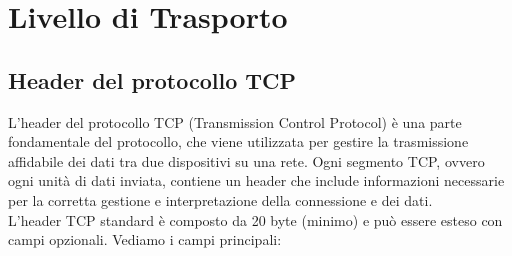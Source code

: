 \documentclass[a4paper]{article}
\begin{document}
\pagebreak

\section{Livello di Trasporto}

\subsection{Header del protocollo TCP}

L'header del protocollo TCP (Transmission Control Protocol) è una parte fondamentale del protocollo, che viene utilizzata per gestire la trasmissione affidabile dei dati tra due dispositivi su una rete. Ogni segmento TCP, ovvero ogni unità di dati inviata, contiene un header che include informazioni necessarie per la corretta gestione e interpretazione della connessione e dei dati.
\\
L'header TCP standard è composto da 20 byte (minimo) e può essere esteso con campi opzionali. Vediamo i campi principali:
\end{document}
